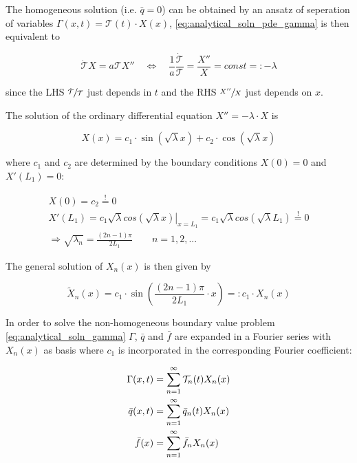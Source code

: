 \documentclass{scrartcl}[12pt, halfparskip]
\begin{document}
The homogeneous solution (i.e. $\bar{q}=0$) can be obtained by an ansatz of seperation of variables $\Gamma(x,t) = \mathcal{T}(t) \cdot X(x)$, \eqref{eq:analytical_soln_pde_gamma} is then equivalent to

\begin{equation}
	\dot{\mathcal{T}} X = a \mathcal{T} X'' \quad \Leftrightarrow \quad \frac{1}{a} \frac{\dot{\mathcal{T}}}{\mathcal{T}} = \frac{X''}{X} = const =: - \lambda
\end{equation}


since the LHS $\sfrac{\dot{\mathcal{T}}}{{\mathcal{T}}}$ just depends in $t$ and the RHS $\sfrac{X''}{X}$ just depends on $x$. 

The solution of the ordinary differential equation $X'' = - \lambda \cdot X$ is

\begin{equation}
	X(x) = c_1 \cdot \sin(\sqrt{\lambda} x) + c_2 \cdot \cos(\sqrt{\lambda} x)
\end{equation}

where $c_1$ and $c_2$ are determined by the boundary conditions $X(0) = 0$ and $X'(L_1) = 0$:

\begin{align}
	X(0) = c_2 \stackrel{!}{=} 0 \\
	X'(L_1) = \left. c_1 \sqrt{\lambda} cos(\sqrt{\lambda} x) \right|_{x=L_1} = c_1 \sqrt{\lambda} cos(\sqrt{\lambda} L_1) \stackrel{!}{=} 0 \\
	\Rightarrow \sqrt{\lambda_n} = \frac{(2n -1)\pi}{2 L_1} \qquad n=1,2,...
\end{align}

The general solution of $X_n(x)$ is then given by

\begin{equation}
	\tilde{X}_n(x) = c_1 \cdot \sin\left(\frac{(2n -1)\pi}{2 L_1} \cdot x\right) =: c_1 \cdot X_n(x)
\end{equation}

In order to solve the non-homogeneous boundary value problem \eqref{eq:analytical_soln_gamma} $\Gamma$, $\bar{q}$ and $\bar{f}$ are expanded in a Fourier series with $X_n(x)$ as basis where $c_1$ is incorporated in the corresponding Fourier coefficient:

\begin{subequations}
	\centering
	\begin{align}
		\Gamma(x,t) & = \sum_{n=1}^{\infty} \mathcal{T}_n(t) X_n(x) \\
		\bar{q}(x,t) & = \sum_{n=1}^{\infty} \bar{q}_n(t) X_n(x) \\
		\bar{f}(x) & = \sum_{n=1}^{\infty} \bar{f}_n X_n(x)
	\end{align}
\end{subequations}
\end{document}

